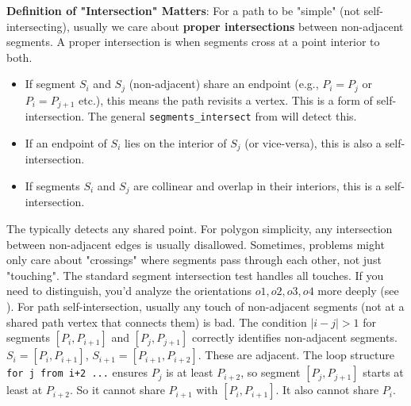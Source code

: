 \begin{gotcha}
\label{gotcha:A.4.3.proper_intersection_definition}
\textbf{Definition of "Intersection" Matters}:
For a path to be "simple" (not self-intersecting), usually we care about \textbf{proper intersections} between non-adjacent segments. A proper intersection is when segments cross at a point interior to both.
\begin{itemize}
    \item If segment $S_i$ and $S_j$ (non-adjacent) share an endpoint (e.g., $P_i = P_j$ or $P_i = P_{j+1}$ etc.), this means the path revisits a vertex. This is a form of self-intersection. The general \texttt{segments\_intersect} from  will detect this.
    \item If an endpoint of $S_i$ lies on the interior of $S_j$ (or vice-versa), this is also a self-intersection.
    \item If segments $S_i$ and $S_j$ are collinear and overlap in their interiors, this is a self-intersection.
\end{itemize}
The  typically detects any shared point. For polygon simplicity, any intersection between non-adjacent edges is usually disallowed.
Sometimes, problems might only care about "crossings" where segments pass through each other, not just "touching". The standard segment intersection test handles all touches. If you need to distinguish, you'd analyze the orientations $o1, o2, o3, o4$ more deeply (see ). For path self-intersection, usually any touch of non-adjacent segments (not at a shared path vertex that connects them) is bad.
The condition $|i-j|>1$ for segments $[P_i, P_{i+1}]$ and $[P_j, P_{j+1}]$ correctly identifies non-adjacent segments. $S_i = [P_i, P_{i+1}]$, $S_{i+1} = [P_{i+1}, P_{i+2}]$. These are adjacent.
The loop structure \texttt{for j from i+2 ...} ensures $P_j$ is at least $P_{i+2}$, so segment $[P_j, P_{j+1}]$ starts at least at $P_{i+2}$. So it cannot share $P_{i+1}$ with $[P_i, P_{i+1}]$. It also cannot share $P_i$.
\end{gotcha}

